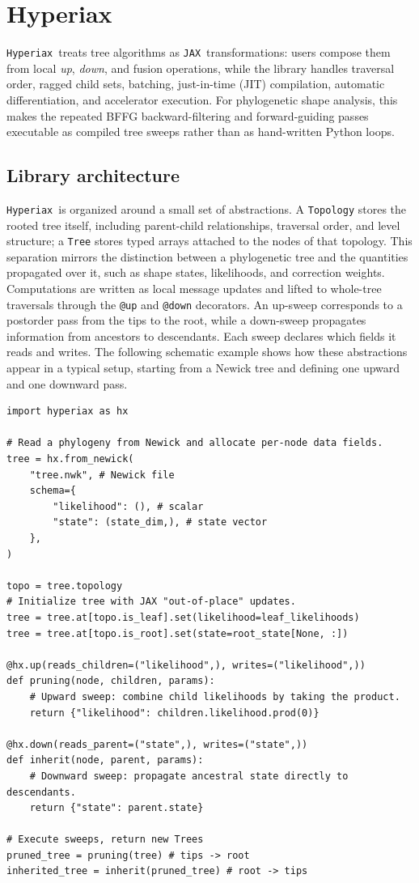 \documentclass[unnumsec,webpdf,contemporary,large]{oup-authoring-template}
\newcommand{\Hyperiax}{\texttt{Hyperiax}}
\newcommand{\JAX}{\texttt{JAX}}
\begin{document}
\section{Hyperiax}
\Hyperiax\ treats tree algorithms as \JAX\ transformations: users compose them from local \emph{up}, \emph{down}, and fusion operations, while the library handles traversal order, ragged child sets, batching, just-in-time (JIT) compilation, automatic differentiation, and accelerator execution. For phylogenetic shape analysis, this makes the repeated BFFG backward-filtering and forward-guiding passes executable as compiled tree sweeps rather than as hand-written Python loops.

\subsection{Library architecture}
\Hyperiax\ is organized around a small set of abstractions. A \texttt{Topology} stores the rooted tree itself, including parent-child relationships, traversal order, and level structure; a \texttt{Tree} stores typed arrays attached to the nodes of that topology. This separation mirrors the distinction between a phylogenetic tree and the quantities propagated over it, such as shape states, likelihoods, and correction weights. Computations are written as local message updates and lifted to whole-tree traversals through the \texttt{@up} and \texttt{@down} decorators. An up-sweep corresponds to a postorder pass from the tips to the root, while a down-sweep propagates information from ancestors to descendants. Each sweep declares which fields it reads and writes. The following schematic example shows how these abstractions appear in a typical setup, starting from a Newick tree and defining one upward and one downward pass.

\begin{verbatim}
import hyperiax as hx

# Read a phylogeny from Newick and allocate per-node data fields.
tree = hx.from_newick(
    "tree.nwk", # Newick file
    schema={
        "likelihood": (), # scalar
        "state": (state_dim,), # state vector
    },
)

topo = tree.topology
# Initialize tree with JAX "out-of-place" updates.
tree = tree.at[topo.is_leaf].set(likelihood=leaf_likelihoods)
tree = tree.at[topo.is_root].set(state=root_state[None, :])

@hx.up(reads_children=("likelihood",), writes=("likelihood",))
def pruning(node, children, params):
    # Upward sweep: combine child likelihoods by taking the product.
    return {"likelihood": children.likelihood.prod(0)}

@hx.down(reads_parent=("state",), writes=("state",))
def inherit(node, parent, params):
    # Downward sweep: propagate ancestral state directly to descendants.
    return {"state": parent.state}

# Execute sweeps, return new Trees
pruned_tree = pruning(tree) # tips -> root
inherited_tree = inherit(pruned_tree) # root -> tips
\end{verbatim}
\end{document}
